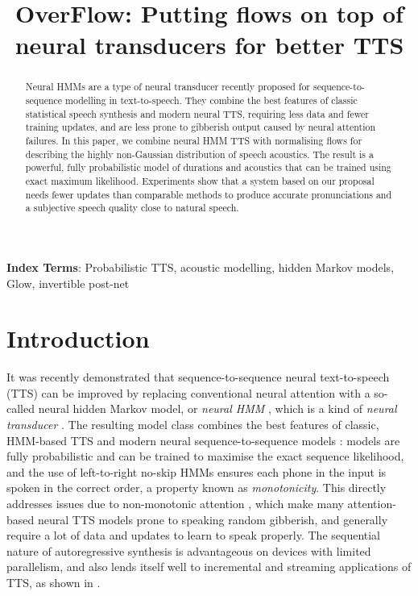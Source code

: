 \documentclass[british]{INTERSPEECH2023_arxiv}
\title{OverFlow: Putting flows on top of neural transducers for better TTS}
\begin{document}
\pagestyle{plain}
\maketitle
\begin{abstract}
Neural HMMs are a type of neural transducer recently proposed for sequence-to-sequence modelling in text-to-speech. They combine the best features of classic statistical speech synthesis and modern neural TTS, requiring less data and fewer training updates, and are less prone to gibberish output caused by neural attention failures. In this paper, we combine neural HMM TTS with normalising flows for describing the highly non-Gaussian distribution of speech acoustics. The result is a powerful, fully probabilistic model of durations and acoustics that can be trained using exact maximum likelihood. Experiments show that a system based on our proposal needs fewer updates than comparable methods to produce accurate pronunciations and a subjective speech quality close to natural speech.
\end{abstract}
\noindent\textbf{Index Terms}: Probabilistic TTS, acoustic modelling, hidden Markov models, Glow, invertible post-net
\section{Introduction}
\label{sec:intro}
It was recently demonstrated \cite{mehta2022neural} that sequence-to-sequence neural text-to-speech (TTS) can be improved by replacing conventional neural attention with a so-called neural hidden Markov model, or \emph{neural HMM} \cite{tran2016unsupervised}, which is a kind of \emph{neural transducer} \cite{yu2016online}.
The resulting model class combines the best features of classic, HMM-based TTS and modern neural sequence-to-sequence models \cite{watts2019where,mehta2022neural}:
models are fully probabilistic and can be trained to maximise the exact sequence likelihood, and the use of left-to-right no-skip HMMs ensures each phone in the input is spoken in the correct order, a property known as \emph{monotonicity}.
This directly addresses issues due to non-monotonic attention \cite{he2019robust}, which make many attention-based neural TTS models prone to speaking random gibberish, and generally require a lot of data and updates to learn to speak properly.
The sequential nature of autoregressive synthesis is advantageous on devices with limited parallelism, and also lends itself well to incremental and streaming applications of TTS, as shown in \cite{chen2021speech}.
\end{document}
